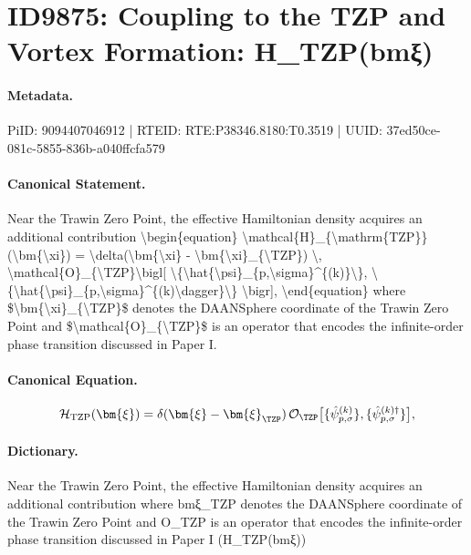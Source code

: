 \section*{ID9875: Coupling to the TZP and Vortex Formation: H\_TZP(bmξ)}
\paragraph{Metadata.}
PiID: 9094407046912 | RTEID: RTE:P38346.8180:T0.3519 | UUID: 37ed50ce-081c-5855-836b-a040ffcfa579

\paragraph{Canonical Statement.}
Near the Trawin Zero Point, the effective Hamiltonian density acquires an additional contribution \textbackslash{}begin\{equation\} \textbackslash{}mathcal\{H\}\_\{\textbackslash{}mathrm\{TZP\}\}(\textbackslash{}bm\{\textbackslash{}xi\}) = \textbackslash{}delta(\textbackslash{}bm\{\textbackslash{}xi\} - \textbackslash{}bm\{\textbackslash{}xi\}\_\{\textbackslash{}TZP\}) \textbackslash{}, \textbackslash{}mathcal\{O\}\_\{\textbackslash{}TZP\}\textbackslash{}bigl[ \textbackslash{}\{\textbackslash{}hat\{\textbackslash{}psi\}\_\{p,\textbackslash{}sigma\}\textasciicircum{}\{(k)\}\textbackslash{}\}, \textbackslash{}\{\textbackslash{}hat\{\textbackslash{}psi\}\_\{p,\textbackslash{}sigma\}\textasciicircum{}\{(k)\textbackslash{}dagger\}\textbackslash{}\} \textbackslash{}bigr], \textbackslash{}end\{equation\} where \$\textbackslash{}bm\{\textbackslash{}xi\}\_\{\textbackslash{}TZP\}\$ denotes the DAANSphere coordinate of the Trawin Zero Point and \$\textbackslash{}mathcal\{O\}\_\{\textbackslash{}TZP\}\$ is an operator that encodes the infinite-order phase transition discussed in Paper I.

\paragraph{Canonical Equation.}
\[
\mathcal{H}_{\mathrm{TZP}}(\bm{\xi}) = \delta(\bm{\xi} - \bm{\xi}_{\TZP}) \, \mathcal{O}_{\TZP}\bigl[ \{\hat{\psi}_{p,\sigma}^{(k)}\}, \{\hat{\psi}_{p,\sigma}^{(k)\dagger}\} \bigr],
\]

\paragraph{Dictionary.}
Near the Trawin Zero Point, the effective Hamiltonian density acquires an additional contribution where bmξ\_TZP denotes the DAANSphere coordinate of the Trawin Zero Point and O\_TZP is an operator that encodes the infinite-order phase transition discussed in Paper I (H\_TZP(bmξ))

